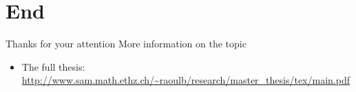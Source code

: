 \documentclass{beamer}
\newcommand{\burl}[1]{\footnotesize{\url{#1}}}
\begin{document}
\section{End}


\begin{frame}{Thanks for your attention}
  More information on the topic
  \begin{itemize}
  \item The full thesis:\\
    {\burl{http://www.sam.math.ethz.ch/~raoulb/research/master_thesis/tex/main.pdf}}
  \end{itemize}

  \scriptsize
  
  
\end{frame}
\end{document}
